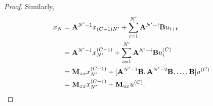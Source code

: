 \begin{proof}
Similarly,
\begin{align*}
x_N &= \mathbf{A}^{N'-1}x_{(C-1)N'} + \sum_{i=1}^{N'} \mathbf{A}^{N'-i}\mathbf{B} u_{i+t} \\
&= \mathbf{A}^{N'-1}x_{N'}^{(C-1)} + \sum_{i=1}^{N'} \mathbf{A}^{N'-i}\mathbf{B} u^{(C)}_i \\
&= \mathbf{M}_{xx}x_{N'}^{(C-1)} + [\mathbf{A}^{N'-1}\mathbf{B}, \mathbf{A}^{N'-2}\mathbf{B}, \dots, \mathbf{B}]u^{(C)} \\
&= \mathbf{M}_{xx}x_{N'}^{(C-1)} + \mathbf{M}_{ux}u^{(C)}.
\end{align*}
\end{proof}
